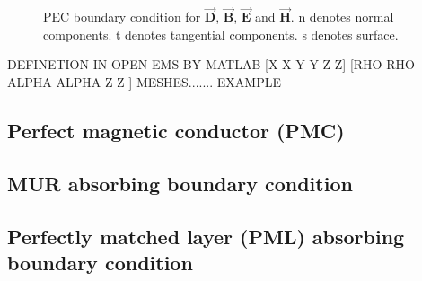     \begin{figure}[ht]
      \centering
	  \qquad
	  \qquad 
	  \qquad
	  \qquad 
	    \caption[PEC BC diagrams]{PEC boundary condition  for $\vec{\mathbf{D}}$, $\vec{\mathbf{B}}$, $\vec{\mathbf{E}}$ and $\vec{\mathbf{H}}$. n denotes normal components. t denotes tangential components. s denotes surface.}
	    \label{fig:PEC BC diagrams}
    \end{figure}

     DEFINETION IN OPEN-EMS BY MATLAB [X X Y Y Z Z] [RHO RHO ALPHA ALPHA Z Z ]
     MESHES.......
     EXAMPLE
\subsection{Perfect magnetic conductor (PMC)}

\subsection{MUR absorbing boundary condition}

\subsection{Perfectly matched layer (PML) absorbing boundary condition}

